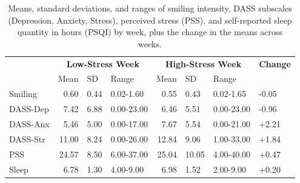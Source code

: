 \documentclass[authordate, empirical]{jote-new-article}
\begin{document}
\begin{table}[b]
  \begin{fullwidth}
    \caption{Means, standard deviations, and ranges of smiling intensity, DASS subscales (Depression, Anxiety, Stress), perceived stress (PSS), and self-reported sleep quantity in hours (PSQI) by week, plus the change in the means across weeks.}
    \begin{tabularx}{\linewidth}{@{} X r l l r l l l @{}}
      \toprule
               & \multicolumn{3}{c}{\textbf{Low-Stress Week}} & \multicolumn{3}{c}{\textbf{High-Stress Week}}
               & \textbf{Change}                                                                                                                                \\


               & Mean                                         & SD                                            & Range      & Mean  & SD    & Range      &       \\
      \midrule

      Smiling  & 0.60                                         & 0.44                                          & 0.02-1.60  & 0.55  & 0.43  & 0.02-1.65  & -0.05 \\

      DASS-Dep & 7.42                                         & 6.88                                          & 0.00-23.00 & 6.46  & 5.51  & 0.00-23.00 & -0.96 \\

      DASS-Anx & 5.46                                         & 5.00                                          & 0.00-17.00 & 7.67  & 5.54  & 0.00-21.00 & +2.21 \\

      DASS-Str & 11.00                                        & 8.24                                          & 0.00-26.00 & 12.84 & 9.06  & 1.00-33.00 & +1.84
      \\

      PSS      & 24.57                                        & 8.50                                          & 6.00-37.00 & 25.04 & 10.05 & 4.00-40.00 & +0.47 \\

      Sleep    & 6.78                                         & 1.30                                          & 4.00-9.00  & 6.98  & 1.52  & 2.00-9.00  & +0.20 \\
      \bottomrule
    \end{tabularx}
  \end{fullwidth}
\end{table}
\end{document}
